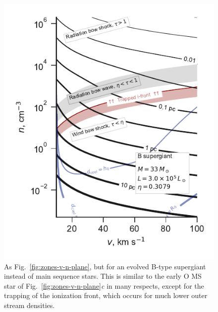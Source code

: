 \message{ !name(dusty-bow-wave.tex)}\documentclass[useAMS, usenatbib, a4paper]{mnras}
\begin{document}
\begin{figure}
  \includegraphics[width=\linewidth]{figs/zones-v-n-plane-BSG}
  \caption{As Fig.~\ref{fig:zones-v-n-plane}, but for an evolved
    B-type supergiant instead of main sequence stars.  This is similar
    to the early O MS star of Fig.~\ref{fig:zones-v-n-plane}\textit{c}
    in many respects, except for the trapping of the ionization front,
    which occurs for much lower outer stream densities.}
  \label{fig:B-supergiant}
\end{figure}
\end{document}
